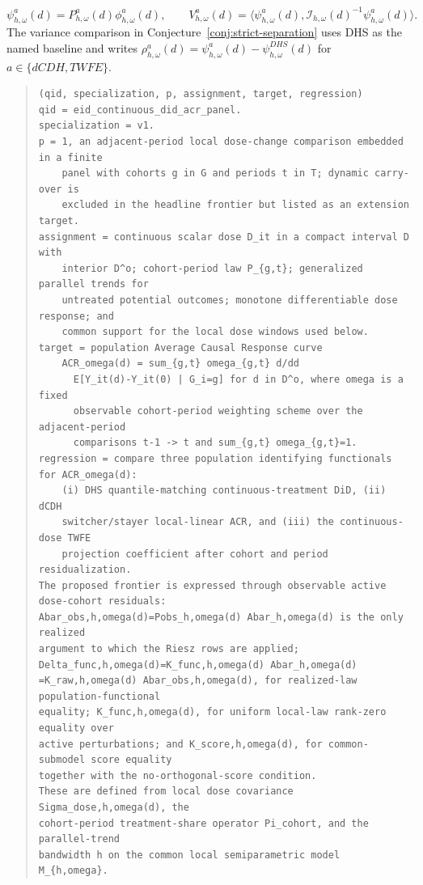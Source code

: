 \documentclass[11pt]{article}
\theoremstyle{definition}
\theoremstyle{plain}
\theoremstyle{remark}
\begin{document}
\[
  \psi^a_{h,\omega}(d)=P^a_{h,\omega}(d)\phi^a_{h,\omega}(d),
  \qquad
  V^a_{h,\omega}(d)=\langle\psi^a_{h,\omega}(d),
    \mathcal I_{h,\omega}(d)^{-1}\psi^a_{h,\omega}(d)\rangle.
\]
The variance comparison in Conjecture~\ref{conj:strict-separation} uses DHS as the named baseline and writes \(\rho^a_{h,\omega}(d)=\psi^a_{h,\omega}(d)-\psi^{DHS}_{h,\omega}(d)\) for \(a\in\{dCDH,TWFE\}\).

\begin{quote}
\begin{verbatim}
(qid, specialization, p, assignment, target, regression)
qid = eid_continuous_did_acr_panel.
specialization = v1.
p = 1, an adjacent-period local dose-change comparison embedded in a finite
    panel with cohorts g in G and periods t in T; dynamic carry-over is
    excluded in the headline frontier but listed as an extension target.
assignment = continuous scalar dose D_it in a compact interval D with
    interior D^o; cohort-period law P_{g,t}; generalized parallel trends for
    untreated potential outcomes; monotone differentiable dose response; and
    common support for the local dose windows used below.
target = population Average Causal Response curve
    ACR_omega(d) = sum_{g,t} omega_{g,t} d/dd
      E[Y_it(d)-Y_it(0) | G_i=g] for d in D^o, where omega is a fixed
      observable cohort-period weighting scheme over the adjacent-period
      comparisons t-1 -> t and sum_{g,t} omega_{g,t}=1.
regression = compare three population identifying functionals for ACR_omega(d):
    (i) DHS quantile-matching continuous-treatment DiD, (ii) dCDH
    switcher/stayer local-linear ACR, and (iii) the continuous-dose TWFE
    projection coefficient after cohort and period residualization.
The proposed frontier is expressed through observable active dose-cohort residuals:
Abar_obs,h,omega(d)=Pobs_h,omega(d) Abar_h,omega(d) is the only realized
argument to which the Riesz rows are applied;
Delta_func,h,omega(d)=K_func,h,omega(d) Abar_h,omega(d)
=K_raw,h,omega(d) Abar_obs,h,omega(d), for realized-law population-functional
equality; K_func,h,omega(d), for uniform local-law rank-zero equality over
active perturbations; and K_score,h,omega(d), for common-submodel score equality
together with the no-orthogonal-score condition.
These are defined from local dose covariance Sigma_dose,h,omega(d), the
cohort-period treatment-share operator Pi_cohort, and the parallel-trend
bandwidth h on the common local semiparametric model M_{h,omega}.
\end{verbatim}
\end{quote}
\end{document}
